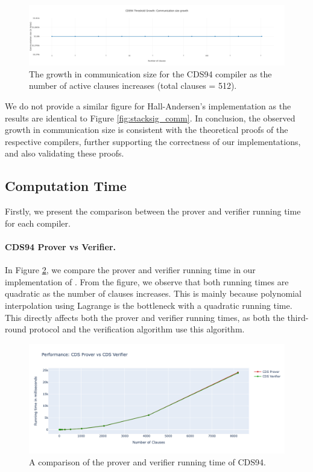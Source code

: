 \begin{figure}[h]
  \centering
  \includegraphics[width=\linewidth]{../assets/plots/cds2_threshold.png}
  \caption{The growth in communication size for the CDS94 compiler as the number of active clauses increases (total clauses = 512).}
  \label{fig:cds_comm2}
\end{figure}

We do not provide a similar figure for Hall-Andersen's implementation as the 
results are identical to Figure \ref{fig:stacksig_comm}. In conclusion, the 
observed growth in communication size is consistent with the theoretical
proofs of the respective compilers, further supporting the correctness of our
implementations, and also validating these proofs.

\subsection{Computation Time}\label{eval:time}
Firstly, we present the comparison between the prover and verifier running 
time for each compiler. 

\paragraph{CDS94 Prover vs Verifier.} In Figure \ref{fig:cds_vs}, we compare the 
prover and 
verifier running time in our implementation of \cite{CDS94}. From the figure, 
we observe that both running times are quadratic as 
the number of clauses increases. This is mainly because polynomial interpolation
using Lagrange is the bottleneck with a quadratic running time. This 
directly affects both the prover and verifier running times, as both the 
third-round protocol and the verification algorithm use this algorithm. 

\begin{figure}[H]
  \centering
  \includegraphics[width=\linewidth]{../assets/plots/cds_vs.png}
  \caption{A comparison of the prover and verifier running time of CDS94. }
  \label{fig:cds_vs}
\end{figure}

